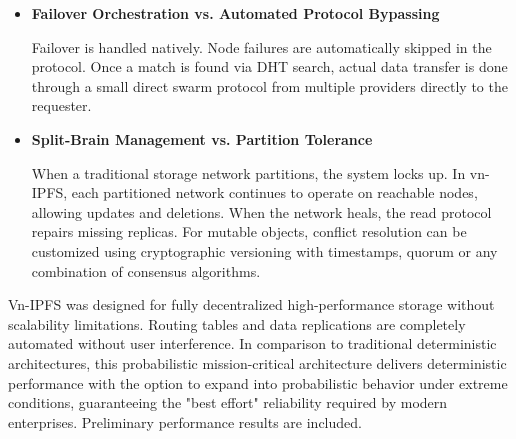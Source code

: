 \documentclass[conference]{IEEEtran}
\begin{document}
\begin{itemize}
\item \textbf{Failover Orchestration vs. Automated Protocol Bypassing}

Failover is handled natively. Node failures are automatically skipped in the protocol. Once a match is found via DHT search, actual data transfer is done through a small direct swarm protocol from multiple providers directly to the requester.

\item \textbf{Split-Brain Management vs. Partition Tolerance}

When a traditional storage network partitions, the system locks up. In vn-IPFS, each partitioned network continues to operate on reachable nodes, allowing updates and deletions. When the network heals, the read protocol repairs missing replicas. For mutable objects, conflict resolution can be customized using cryptographic versioning with timestamps, quorum or any combination of consensus algorithms.
\end{itemize}

Vn-IPFS was designed for fully decentralized high-performance storage without scalability limitations. Routing tables and data replications are completely automated without user interference. In comparison to traditional deterministic architectures, this probabilistic mission-critical architecture delivers deterministic performance with the option to expand into probabilistic behavior under extreme conditions, guaranteeing the "best effort" reliability required by modern enterprises. Preliminary performance results are included.
\end{document}
